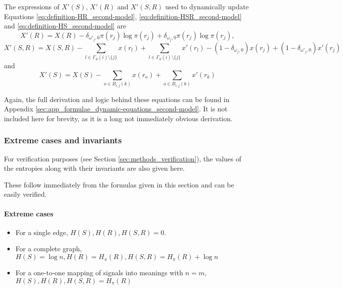 The expressions of $X'(S)$, $X'(R)$ and $X'(S,R)$ used to dynamically update Equations \eqref{eq:definition-HR_second-model}, \eqref{eq:definition-HSR_second-model} and \eqref{eq:definition-HS_second-model} are
\begin{equation}
  \label{eq:definition-XR_second-model_dynamic}
  X'(R) = X(R) - \delta_{\omega'_j,0} \pi(r_j) \log \pi(r_j) + \delta_{\omega_j,0} \pi(r_j) \log \pi(r_j),
\end{equation}
\begin{equation}
  \label{eq:definition-XSR_second-model_dynamic}
  X'(S,R) = X(S,R) - \sum_{l \in \Gamma_S(i) \setminus \{ j \}} x(r_l) + \sum_{l \in \Gamma_S(i) \setminus \{ j \}} x'(r_l) - (1 - \delta_{\omega_j,0}) x(r_j) + (1 - \delta_{\omega'_j,0}) x'(r_j)
\end{equation}
and
\begin{equation}
  \label{eq:definition-XS_second-model_dynamic}
  X'(S) = X(S) - \sum_{o \in B_{i,j}(k)} x(r_o) + \sum_{o \in B_{i,j}(k)} x'(r_k)
\end{equation}

Again, the full derivation and logic behind these equations can be found in Appendix \ref{sec:app_formulae_dynamic-equations_second-model}.
It is not included here for brevity, as it is a long not immediately obvious derivation.

\subsubsection{Extreme cases and invariants}
\label{sec:model_math_first-model_invariants}

For verification purposes (see Section \ref{sec:methods_verification}), the values of the entropies along with their invariants are also given here.

These follow immediately from the formulas given in this section and can be easily verified.

\paragraph{Extreme cases}
\begin{itemize}
\item For a single edge, $H(S), H(R), H(S,R) = 0$.
\item For a complete graph, $H(S) = \log n, H(R) = H_\pi(R), H(S,R) = H_\pi(R) + \log n$
\item For a one-to-one mapping of signals into meanings with $n=m$, $H(S), H(R), H(S,R) = H_\pi(R)$
\end{itemize}

